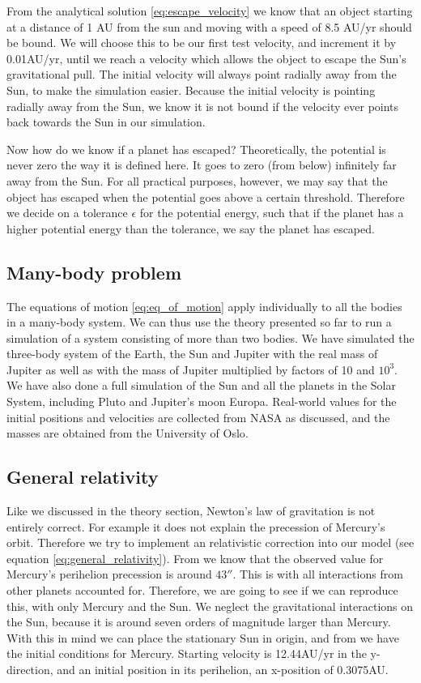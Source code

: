 \documentclass[reprint, english,notitlepage,nofootinbib]{revtex4-1}  %
\begin{document}
From the analytical solution \eqref{eq:escape_velocity} we know that an object starting at a distance of 1 AU from the sun and moving with a speed of 8.5 AU/yr should be bound. We will choose this to be our first test velocity, and increment it by 0.01AU/yr, until we reach a velocity which allows the object to escape the Sun's gravitational pull. The initial velocity will always point radially away from the Sun, to make the simulation easier. Because the initial velocity is pointing radially away from the Sun, we know it is not bound if the velocity ever points back towards the Sun in our simulation.

Now how do we know if a planet has escaped? Theoretically, the potential is never zero the way it is defined here. It goes to zero (from below) infinitely far away from the Sun. For all practical purposes, however, we may say that the object has escaped when the potential goes above a certain threshold. Therefore we decide on a tolerance $\epsilon$ for the potential energy, such that if the planet has a higher potential energy than the tolerance, we say the planet has escaped.


\subsection{Many-body problem}

The equations of motion \eqref{eq:eq_of_motion} apply individually to all the bodies in a many-body system. We can thus use the theory presented so far to run a simulation of a system consisting of more than two bodies. We have simulated the three-body system of the Earth, the Sun and Jupiter with the real mass of Jupiter as well as with the mass of Jupiter multiplied by factors of 10 and $10^3$. We have also done a full simulation of the Sun and all the planets in the Solar System, including Pluto and Jupiter's moon Europa. Real-world values for the initial positions and velocities are collected from NASA as discussed, and the masses are obtained from the University of Oslo\citep{oppgavetekst}.


\subsection{General relativity}

Like we discussed in the theory section, Newton's law of gravitation is not entirely correct. For example it does not explain the precession of Mercury's orbit. Therefore we try to implement an relativistic correction into our model (see equation \eqref{eq:general_relativity}). From \citep{oppgavetekst} we know that the observed value for Mercury's perihelion precession is around $43''$. This is with all interactions from other planets accounted for. Therefore, we are going to see if we can reproduce this, with only Mercury and the Sun. We neglect the gravitational interactions on the Sun, because it is around seven orders of magnitude larger than Mercury. With this in mind we can place the stationary Sun in origin, and from \citep{oppgavetekst} we have the initial conditions for Mercury. Starting velocity is 12.44AU/yr in the y-direction, and an initial position in its perihelion, an x-position of 0.3075AU.
\end{document}

